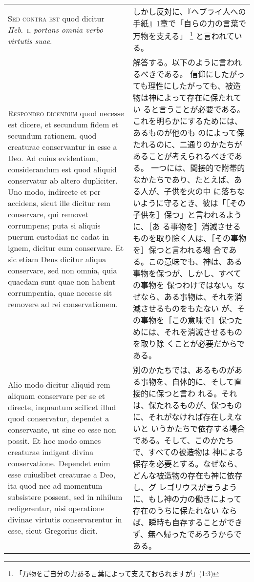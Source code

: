 \documentclass[10pt]{jsarticle} %
\begin{document}
\begin{longtable}{p{21em}p{21em}}
\\


{\scshape  Sed contra est} quod dicitur {\itshape Heb}.~{\scshape i}, {\itshape portans
omnia verbo virtutis suae}.

&

しかし反対に、『ヘブライ人への手紙』1章で「自らの力の言葉で万物を支える」
 \footnote{「万物をご自分の力ある言葉によって支えておられますが」(1:3)}
 と言われている。
\\


{\scshape Respondeo dicendum} quod necesse est dicere,
et secundum fidem et secundum rationem, quod creaturae conservantur in
esse a Deo. Ad cuius evidentiam, considerandum est quod aliquid
conservatur ab altero dupliciter. Uno modo, indirecte et per accidens,
sicut ille dicitur rem conservare, qui removet corrumpens; puta si
aliquis puerum custodiat ne cadat in ignem, dicitur eum conservare. Et
sic etiam Deus dicitur aliqua conservare, sed non omnia, quia quaedam
sunt quae non habent corrumpentia, quae necesse sit removere ad rei
conservationem.


&

解答する。以下のように言われるべきである。
信仰にしたがっても理性にしたがっても、被造物は神によって存在に保たれてい
 ると言うことが必要である。これを明らかにするためには、あるものが他のも
 のによって保たれるのに、二通りのかたちがあることが考えられるべきである。
一つには、間接的で附帯的なかたちであり、たとえば、ある人が、子供を火の中
 に落ちないように守るとき、彼は「［その子供を］保つ」と言われるように、［あ
 る事物を］消滅させるものを取り除く人は、［その事物を］保つと言われる場
 合である。この意味でも、神は、ある事物を保つが、しかし、すべての事物を
 保つわけではない。なぜなら、ある事物は、それを消滅させるものをもたない
 が、その事物を［この意味で］保つためには、それを消滅させるものを取り除
 くことが必要だからである。

\\


Alio modo dicitur aliquid rem aliquam conservare per se
et directe, inquantum scilicet illud quod conservatur, dependet a
conservante, ut sine eo esse non possit. Et hoc modo omnes creaturae
indigent divina conservatione. Dependet enim esse cuiuslibet creaturae a
Deo, ita quod nec ad momentum subsistere possent, sed in nihilum
redigerentur, nisi operatione divinae virtutis conservarentur in esse,
sicut Gregorius dicit.


&

別のかたちでは、あるものがある事物を、自体的に、そして直接的に保つと言わ
 れる。それは、保たれるものが、保つものに、それがなければ存在しえないと
 いうかたちで依存する場合である。そして、このかたちで、すべての被造物は
 神による保存を必要とする。なぜなら、どんな被造物の存在も神に依存し、グ
 レゴリウスが言うように、もし神の力の働きによって存在のうちに保たれない
 ならば、瞬時も自存することができず、無へ帰ったであろうからである。


\end{longtable}
\end{document}
